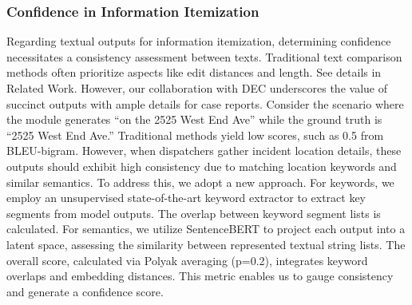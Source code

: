 \subsubsection{Confidence in Information Itemization}


Regarding textual outputs for information itemization, determining confidence necessitates a consistency assessment between texts. Traditional text comparison methods often prioritize aspects like edit distances and length. See details in Related Work. However, our collaboration with DEC underscores the value of succinct outputs with ample details for case reports. Consider the scenario where the module generates ``on the 2525 West End Ave'' while the ground truth is ``2525 West End Ave.'' Traditional methods yield low scores, such as 0.5 from BLEU-bigram. However, when dispatchers gather incident location details, these outputs should exhibit high consistency due to matching location keywords and similar semantics. To address this, we adopt a new approach. For keywords, we employ an unsupervised state-of-the-art keyword extractor \cite{campos2018yake} to extract key segments from model outputs. The overlap between keyword segment lists is calculated. For semantics, we utilize SentenceBERT \cite{reimers-2019-sentence-bert} to project each output into a latent space, assessing the similarity between represented textual string lists. The overall score, calculated via Polyak averaging (p=0.2), integrates keyword overlaps and embedding distances. This metric enables us to gauge consistency and generate a confidence score.

